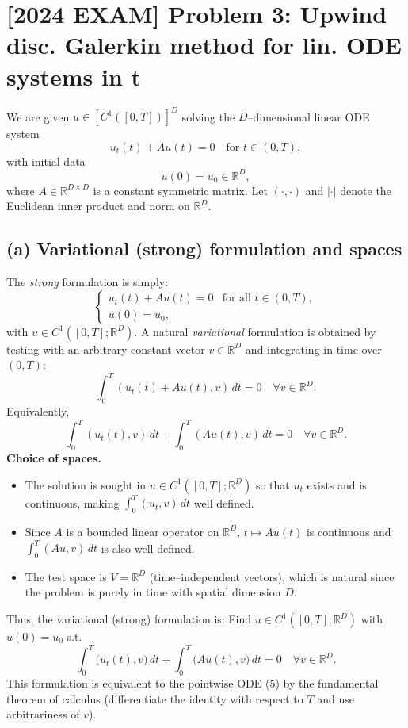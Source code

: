 \section*{[2024 EXAM] Problem 3: Upwind disc. Galerkin method for lin. ODE systems in t}

We are given $u \in [C^1([0,T])]^{D}$ solving the $D$--dimensional linear ODE system
\[
    u_t(t) + A u(t) = 0 \quad\text{for } t\in(0,T), \tag{5}
\]
with initial data
\[
    u(0) = u_0 \in \mathbb{R}^D,
\]
where $A\in\mathbb{R}^{D\times D}$ is a constant symmetric matrix.
Let $(\cdot,\cdot)$ and $|\cdot|$ denote the Euclidean inner product and norm on $\mathbb{R}^D$.
\subsection*{(a) Variational (strong) formulation and spaces}
The \emph{strong} formulation is simply:
\[
    \begin{cases}
        u_t(t) + A u(t) = 0 & \text{for all } t\in(0,T), \\[2mm]
        u(0) = u_0,         &
    \end{cases}
\]
with $u \in C^1([0,T];\mathbb{R}^D)$.
A natural \emph{variational} formulation is obtained by testing with an arbitrary constant
vector $v\in\mathbb{R}^D$ and integrating in time over $(0,T)$:
\[
    \int_0^T (u_t(t) + A u(t), v)\,dt = 0
    \quad\forall v\in\mathbb{R}^D.
\]
Equivalently,
\[
    \int_0^T (u_t(t), v)\,dt + \int_0^T (A u(t), v)\,dt = 0
    \quad\forall v\in\mathbb{R}^D.
\]
\textbf{Choice of spaces.}
\begin{itemize}
    \item The solution is sought in $u \in C^1([0,T];\mathbb{R}^D)$ so that $u_t$ exists
          and is continuous, making $\int_0^T (u_t,v)\,dt$ well defined.
    \item Since $A$ is a bounded linear operator on $\mathbb{R}^D$,
          $t\mapsto Au(t)$ is continuous and $\int_0^T (Au,v)\,dt$ is also well defined.
    \item The test space is $V = \mathbb{R}^D$ (time--independent vectors), which is natural
          since the problem is purely in time with spatial dimension $D$.
\end{itemize}
Thus, the variational (strong) formulation is:
Find  $u \in C^1([0,T];\mathbb{R}^D)$ with $u(0)=u_0$ s.t.
\[
    \boxed{
        \int_0^T \bigl( u_t(t), v \bigr)\,dt
        +
        \int_0^T \bigl( A u(t), v\bigr)\,dt = 0
        \quad\forall v\in\mathbb{R}^D.
    }
\]
This formulation is equivalent to the pointwise ODE (5) by the fundamental theorem
of calculus (differentiate the identity with respect to $T$ and use arbitrariness of $v$).
